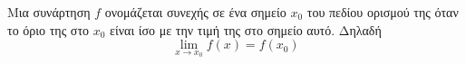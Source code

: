 Μια συνάρτηση $ f $ ονομάζεται συνεχής σε ένα σημείο $ x_0 $ του πεδίου ορισμού της όταν το όριο της στο $ x_0 $ είναι ίσο με την τιμή της στο σημείο αυτό. Δηλαδή \[ \lim_{x\rightarrow x_0}{f(x)}=f(x_0) \]
